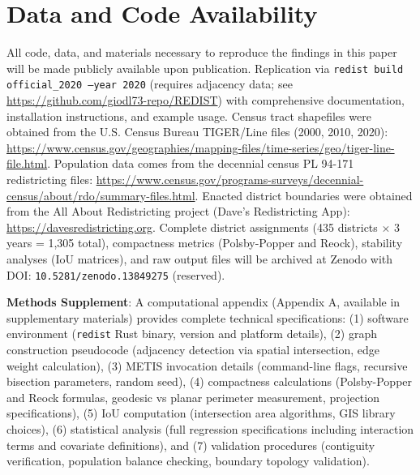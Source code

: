 \documentclass[11pt]{article}
\begin{document}
\section*{Data and Code Availability}
All code, data, and materials necessary to reproduce the findings in this paper will be made publicly available upon publication. Replication via \texttt{redist build official\_2020 --year 2020} (requires adjacency data; see \url{https://github.com/giodl73-repo/REDIST}) with comprehensive documentation, installation instructions, and example usage. Census tract shapefiles were obtained from the U.S. Census Bureau TIGER/Line files (2000, 2010, 2020): \url{https://www.census.gov/geographies/mapping-files/time-series/geo/tiger-line-file.html}. Population data comes from the decennial census PL 94-171 redistricting files: \url{https://www.census.gov/programs-surveys/decennial-census/about/rdo/summary-files.html}. Enacted district boundaries were obtained from the All About Redistricting project (Dave's Redistricting App): \url{https://davesredistricting.org}. Complete district assignments (435 districts $\times$ 3 years = 1,305 total), compactness metrics (Polsby-Popper and Reock), stability analyses (IoU matrices), and raw output files will be archived at Zenodo with DOI: \texttt{10.5281/zenodo.13849275} (reserved).

\textbf{Methods Supplement}: A computational appendix (Appendix A, available in supplementary materials) provides complete technical specifications: (1) software environment (\texttt{redist} Rust binary, version and platform details), (2) graph construction pseudocode (adjacency detection via spatial intersection, edge weight calculation), (3) METIS invocation details (command-line flags, recursive bisection parameters, random seed), (4) compactness calculations (Polsby-Popper and Reock formulas, geodesic vs planar perimeter measurement, projection specifications), (5) IoU computation (intersection area algorithms, GIS library choices), (6) statistical analysis (full regression specifications including interaction terms and covariate definitions), and (7) validation procedures (contiguity verification, population balance checking, boundary topology validation).



\end{document}
